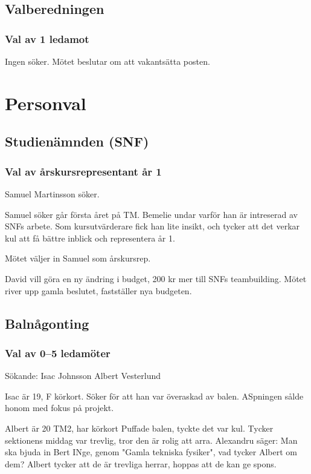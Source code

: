\documentclass[hidelinks]{sektionsmote}
\begin{document}
\subsection{Valberedningen}

\subsubsection{Val av 1 ledamot}
Ingen söker.
Mötet beslutar om att vakantsätta posten.


\section{Personval}

\subsection{Studienämnden (SNF)}

\subsubsection{Val av årskursrepresentant år 1}
Samuel Martinsson söker.

Samuel söker går första året på TM.
Bemelie undar varför han är intreserad av SNFs arbete.
Som kursutvärderare fick han lite insikt, och tycker att det verkar kul att få bättre inblick och representera år 1.

Mötet väljer in Samuel som årskursrep.

\begin{ofraga} \label{uppriven-budget}
    David vill göra en ny ändring i budget, 200 kr mer till SNFs teambuilding.
    Mötet river upp gamla beslutet, fastställer nya budgeten.
\end{ofraga}

\subsection{Balnågonting}

\subsubsection{Val av 0--5 ledamöter}
Sökande:
Isac Johnsson
Albert Vesterlund

Isac är 19, F körkort.
Söker för att han var överaskad av balen. ASpningen sålde honom med fokus på projekt.

Albert är 20 TM2, har körkort
Puffade balen, tyckte det var kul.
Tycker sektionens middag var trevlig, tror den är rolig att arra.
Alexandru säger: Man ska bjuda in Bert INge, genom "Gamla tekniska fysiker", vad tycker Albert om dem?
Albert tycker att de är trevliga herrar, hoppas att de kan ge spons.
\end{document}
